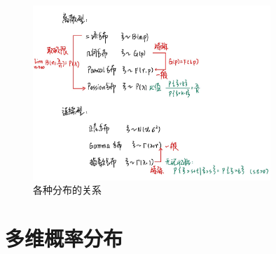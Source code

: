 \documentclass[12pt,a4paper]{amsart}
\begin{document}
\begin{figure}[htbp]
    \centering
    \includegraphics[width=0.8\textwidth]{./src/1.png}
    \caption{各种分布的关系}
    \label{fig:1}
\end{figure}

\section{多维概率分布}

\appendix



{\footnotesize}
\end{document}
